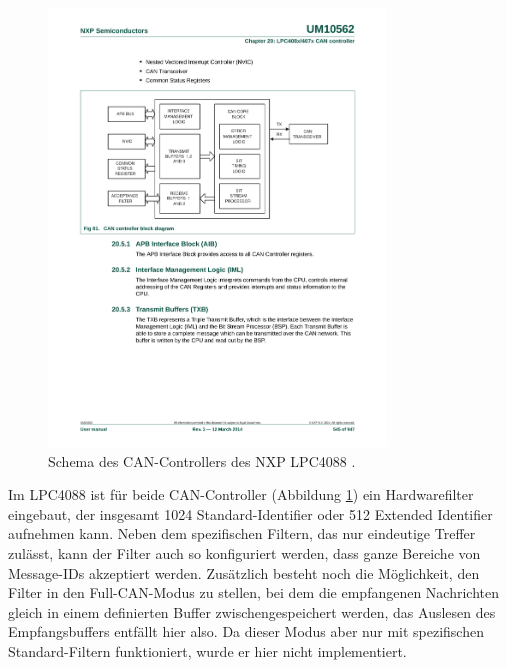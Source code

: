 \begin{figure}
	\centering
		\includegraphics[width=0.8\textwidth]{images/cancontroller.pdf}
	\caption{Schema des CAN-Controllers des NXP LPC4088 \cite{nxplpc4088manual}.}
	\label{fig.cancontroller}
\end{figure}

Im LPC4088 ist für beide CAN-Controller (Abbildung \ref{fig.cancontroller}) ein Hardwarefilter eingebaut, der insgesamt 1024 Standard-Identifier oder 512 Extended Identifier aufnehmen kann. Neben dem spezifischen Filtern, das nur eindeutige Treffer zulässt, kann der Filter auch so konfiguriert werden, dass ganze Bereiche von Message-IDs akzeptiert werden. Zusätzlich besteht noch die Möglichkeit, den Filter in den Full-CAN-Modus zu stellen, bei dem die empfangenen Nachrichten gleich in einem definierten Buffer zwischengespeichert werden, das Auslesen des Empfangsbuffers entfällt hier also. Da dieser Modus aber nur mit spezifischen Standard-Filtern funktioniert, wurde er hier nicht implementiert.

